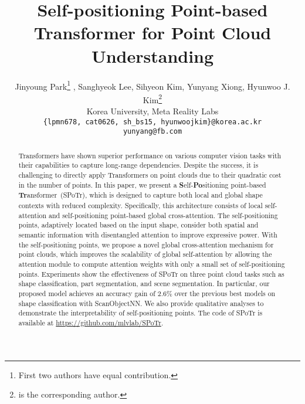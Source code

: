 \documentclass[10pt,twocolumn,letterpaper]{article}
\begin{document}
\title{Self-positioning Point-based Transformer for Point Cloud Understanding}


\author{Jinyoung Park\thanks{First two authors have equal contribution.} , Sanghyeok Lee, Sihyeon Kim, Yunyang Xiong, Hyunwoo J. Kim\thanks{is the corresponding author.}\\
Korea University, Meta Reality Labs\\
{\tt\small \{lpmn678, cat0626, sh\_bs15, hyunwoojkim\}@korea.ac.kr}\\
{\tt\small yunyang@fb.com}
}
\maketitle
\newcommand{\Pointset}{\mathcal{P}}
\newcommand{\Pointgroup}{\mathcal{G}}
\newcommand{\Input}{p}
\newcommand{\Rb}{\mathbb{R}}
\newcommand{\Vpoint}{\delta}
\newcommand{\Vfeat}{\boldsymbol{\psi}}
\newcommand{\Zfeat}{\mathbf{z}}
\newcommand{\Feat}{\mathbf{f}}
\newcommand{\Cen}{x}
\newcommand{\PE}{\phi}
\newcommand{\Pc}{\mathcal{P}}
\newcommand{\Gc}{\mathcal{G}}
\newcommand{\FFN}{\text{MLP}}
\newcommand{\LN}{\text{LN}}
\newcommand{\shl}{\textcolor[rgb]{1,0,0}}
\newcommand{\jyp}{\textcolor{blue}}
\newcommand{\sk}{\textcolor[rgb]{0.5,0.5,0}}
\newcommand{\hjk}[1]{{\color[rgb]{0, 0, 0} #1}}
\newcommand{\name}{SPoTr}
\newcommand{\mycyan}[1]{{\color[rgb]{0.2800,0.4200,0.5000}#1}}

     \begin{abstract}
    Transformers have shown superior performance on various computer vision tasks with their capabilities to capture long-range dependencies. 
Despite the success, it is challenging to directly apply Transformers on point clouds due to their quadratic cost in  the number of points.
In this paper, we present a \textbf{S}elf-\textbf{Po}sitioning point-based \textbf{Tr}ansformer~(SPoTr), which is designed to capture both local and global shape contexts with reduced complexity.
Specifically, this architecture consists of local self-attention and self-positioning point-based global cross-attention.
The self-positioning points, adaptively located based on the input shape, consider both spatial and semantic information with {disentangled attention} to improve expressive power.
With the self-positioning points, we propose a novel global cross-attention mechanism for point clouds, which improves the scalability of global self-attention by allowing the attention module to compute attention weights with only a small set of self-positioning points.
Experiments show the effectiveness of SPoTr on three point cloud tasks such as shape classification, part segmentation, and scene segmentation. 
In particular, our proposed model achieves an accuracy gain of 2.6\% over the previous best models on shape classification with ScanObjectNN.
We also provide qualitative analyses to demonstrate the interpretability of self-positioning points.
The code of SPoTr is available at \url{https://github.com/mlvlab/SPoTr}.
 \end{abstract}
\end{document}
